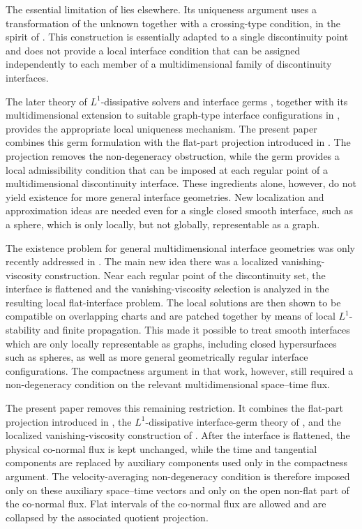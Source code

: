 \documentclass[11pt]{amsart}
\numberwithin{equation}{section}
\theoremstyle{plain}
\theoremstyle{definition}
\theoremstyle{remark}
\begin{document}
The essential limitation of \cite{Mitrovic2011} lies elsewhere. Its
uniqueness argument uses a transformation of the unknown together with a
crossing-type condition, in the spirit of \cite{KRT}. This construction is
essentially adapted to a single discontinuity point and does not provide a
local interface condition that can be assigned independently to each member
of a multidimensional family of discontinuity interfaces.


The later theory of \(L^1\)-dissipative solvers and interface germs
\cite{AKR}, together with its multidimensional extension to suitable
graph-type interface configurations in \cite{AM}, provides the appropriate
local uniqueness mechanism. The present paper combines this germ formulation
with the flat-part projection introduced in \cite{Mitrovic2011}. The
projection removes the non-degeneracy obstruction, while the germ provides a
local admissibility condition that can be imposed at each regular point of a
multidimensional discontinuity interface. These ingredients alone, however,
do not yield existence for more general interface geometries. New localization
and approximation ideas are needed even for a single closed smooth interface,
such as a sphere, which is only locally, but not globally, representable as a
graph.

The existence problem for general multidimensional interface geometries was
only recently addressed in \cite{Mitrovic2025Nondegenerate}. The main new idea
there was a localized vanishing-viscosity construction. Near each regular
point of the discontinuity set, the interface is flattened and the
vanishing-viscosity selection is analyzed in the resulting local
flat-interface problem. The local solutions are then shown to be compatible
on overlapping charts and are patched together by means of local
\(L^1\)-stability and finite propagation. This made it possible to treat
smooth interfaces which are only locally representable as graphs, including
closed hypersurfaces such as spheres, as well as more general geometrically
regular interface configurations. The compactness argument in that work,
however, still required a non-degeneracy condition on the relevant
multidimensional space--time flux.

The present paper removes this remaining restriction. It combines the
flat-part projection introduced in \cite{Mitrovic2011}, the
\(L^1\)-dissipative interface-germ theory of \cite{AKR,AM}, and the localized
vanishing-viscosity construction of
\cite{Mitrovic2025Nondegenerate}. After the interface is flattened, the
physical co-normal flux is kept unchanged, while the time and tangential
components are replaced by auxiliary components used only in the compactness
argument. The velocity-averaging non-degeneracy condition is therefore imposed
only on these auxiliary space--time vectors and only on the open non-flat
part of the co-normal flux. Flat intervals of the co-normal flux are allowed
and are collapsed by the associated quotient projection. 
\end{document}
